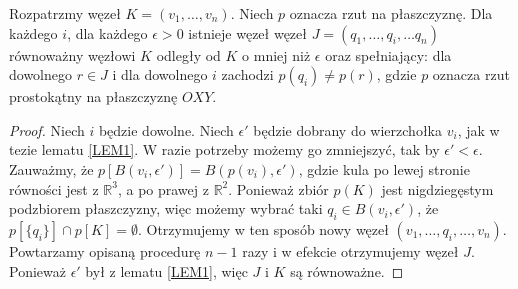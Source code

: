  
\begin{lemat}
 \label{LEM2}
 Rozpatrzmy węzeł $K = (v_1, \ldots, v_n)$. Niech $p$ oznacza rzut na płaszczyznę. Dla każdego $i$, dla każdego $\epsilon > 0$ istnieje węzeł
 węzeł $J = (q_1, \ldots, q_i, \ldots q_n)$ równoważny węzłowi $K$ odległy od $K$ o mniej niż $\epsilon$ oraz spełniający:
 dla dowolnego $r\in J$ i dla dowolnego $i$ zachodzi $p(q_i)\neq p(r)$, gdzie $p$ oznacza rzut prostokątny na płaszczyznę $OXY$.
\end{lemat}
 \begin{proof}
  Niech $i$ będzie dowolne.
  Niech $\epsilon'$ będzie dobrany do wierzchołka $v_i$, jak w tezie lematu \ref{LEM1}. W razie potrzeby możemy go zmniejszyć, tak by $\epsilon'<\epsilon$.
  Zauważmy, że $p[B(v_i, \epsilon')] = B(p(v_i),\epsilon')$, gdzie kula po lewej stronie równości jest z $\mathbb{R}^3$, a po prawej z $\mathbb{R}^2$. Ponieważ zbiór $p(K)$ jest nigdziegęstym podzbiorem płaszczyzny, więc możemy wybrać taki $q_i\in B(v_i, \epsilon')$,
  że $p[\lbrace q_i\rbrace]\cap p[K] = \emptyset$. Otrzymujemy w ten sposób nowy węzeł $(v_1, \ldots, q_i, \ldots, v_n)$. Powtarzamy opisaną procedurę $n-1$ razy i w efekcie
  otrzymujemy węzeł $J$. Ponieważ $\epsilon'$ był z lematu \ref{LEM1}, więc $J$ i $K$ są równoważne.
 \end{proof}
 

